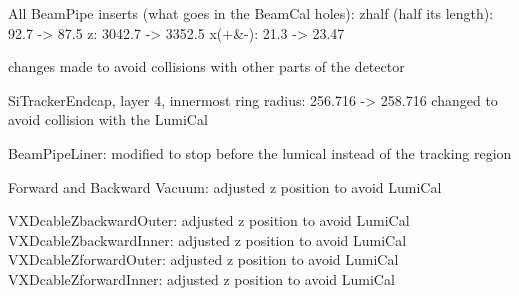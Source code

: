 \documentclass{report}
\begin{document}
            All BeamPipe inserts (what goes in the BeamCal holes):
                zhalf (half its length): 92.7 -> 87.5
                z: 3042.7 -> 3352.5
                x(+&-): 21.3 -> 23.47



        changes made to avoid collisions with other parts of the detector

            SiTrackerEndcap, layer 4, innermost ring radius: 256.716 -> 258.716
                changed to avoid collision with the LumiCal

            BeamPipeLiner: modified to stop before the lumical instead of the tracking
                region

            Forward and Backward Vacuum: adjusted z position to avoid LumiCal

            VXDcableZbackwardOuter: adjusted z position to avoid LumiCal
            VXDcableZbackwardInner: adjusted z position to avoid LumiCal
            VXDcableZforwardOuter: adjusted z position to avoid LumiCal
            VXDcableZforwardInner: adjusted z position to avoid LumiCal





        
    
\end{document}
